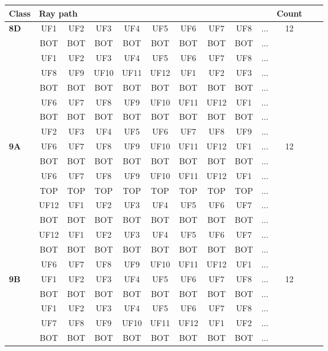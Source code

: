 \begin{table}[h!]
\centering
\begin{tabular}{|l|c|c|c|c|c|c|c|c|c|c|c|c|}
\hline
Class &  \multicolumn{9}{l}{Ray path} \vline  & Count\\
\hline \hline
\textbf{8D} & UF1 & UF2 & UF3 & UF4 & UF5 & UF6 & UF7 & UF8 & $\dots$ & 12\\
 & BOT & BOT & BOT & BOT & BOT & BOT & BOT & BOT & $\dots$ & \\
 & UF1 & UF2 & UF3 & UF4 & UF5 & UF6 & UF7 & UF8 & $\dots$ & \\
 & UF8 & UF9 & UF10 & UF11 & UF12 & UF1 & UF2 & UF3 & $\dots$ & \\
 & BOT & BOT & BOT & BOT & BOT & BOT & BOT & BOT & $\dots$ & \\
 & UF6 & UF7 & UF8 & UF9 & UF10 & UF11 & UF12 & UF1 & $\dots$ & \\
 & BOT & BOT & BOT & BOT & BOT & BOT & BOT & BOT & $\dots$ & \\
 & UF2 & UF3 & UF4 & UF5 & UF6 & UF7 & UF8 & UF9 & $\dots$ & \\
\hline \hline
\textbf{9A} & UF6 & UF7 & UF8 & UF9 & UF10 & UF11 & UF12 & UF1 & $\dots$ & 12\\
 & BOT & BOT & BOT & BOT & BOT & BOT & BOT & BOT & $\dots$ & \\
 & UF6 & UF7 & UF8 & UF9 & UF10 & UF11 & UF12 & UF1 & $\dots$ & \\
 & TOP & TOP & TOP & TOP & TOP & TOP & TOP & TOP & $\dots$ & \\
 & UF12 & UF1 & UF2 & UF3 & UF4 & UF5 & UF6 & UF7 & $\dots$ & \\
 & BOT & BOT & BOT & BOT & BOT & BOT & BOT & BOT & $\dots$ & \\
 & UF12 & UF1 & UF2 & UF3 & UF4 & UF5 & UF6 & UF7 & $\dots$ & \\
 & BOT & BOT & BOT & BOT & BOT & BOT & BOT & BOT & $\dots$ & \\
 & UF6 & UF7 & UF8 & UF9 & UF10 & UF11 & UF12 & UF1 & $\dots$ & \\
\hline \hline
\textbf{9B} & UF1 & UF2 & UF3 & UF4 & UF5 & UF6 & UF7 & UF8 & $\dots$ & 12\\
 & BOT & BOT & BOT & BOT & BOT & BOT & BOT & BOT & $\dots$ & \\
 & UF1 & UF2 & UF3 & UF4 & UF5 & UF6 & UF7 & UF8 & $\dots$ & \\
 & UF7 & UF8 & UF9 & UF10 & UF11 & UF12 & UF1 & UF2 & $\dots$ & \\
 & BOT & BOT & BOT & BOT & BOT & BOT & BOT & BOT & $\dots$ & \\

\end{tabular}
\end{table}

